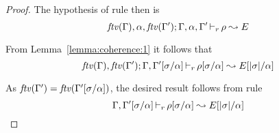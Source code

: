 \begin{proof}
  The hypothesis of rule \label{R-Main} then is
\begin{equation*}
  \mathit{ftv}(\Gamma),\alpha,\mathit{ftv}(\Gamma'); \Gamma,\alpha,\Gamma' \mathop{\vdash_{r}} \rho \leadsto E
\end{equation*}

  From Lemma~\ref{lemma:coherence:1} it follows that
\begin{equation*}
  \mathit{ftv}(\Gamma),\mathit{ftv}(\Gamma'); \Gamma,\Gamma'[\sigma/\alpha] \mathop{\vdash_{r}} \rho[\sigma/\alpha] \leadsto E[|\sigma|/\alpha]
\end{equation*}

  As $\mathit{ftv}(\Gamma') = \mathit{ftv}(\Gamma'[\sigma/\alpha])$, the desired result
  follows from
  rule 
\begin{equation*}
  \Gamma,\Gamma'[\sigma/\alpha] \mathop{\vdash_{r}} \rho[\sigma/\alpha] \leadsto E[|\sigma|/\alpha]
\end{equation*}
\end{proof}

{\centering
{}}

